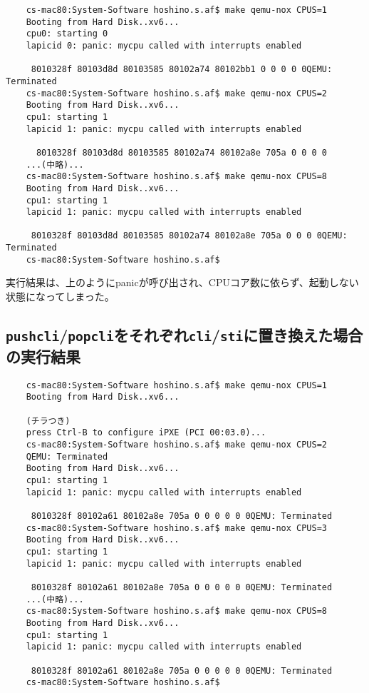 \documentclass[10pt,a4j]{jarticle}
\begin{document}
\begin{screen}
  \begin{verbatim}
    cs-mac80:System-Software hoshino.s.af$ make qemu-nox CPUS=1
    Booting from Hard Disk..xv6...
    cpu0: starting 0
    lapicid 0: panic: mycpu called with interrupts enabled

     8010328f 80103d8d 80103585 80102a74 80102bb1 0 0 0 0 0QEMU: Terminated
    cs-mac80:System-Software hoshino.s.af$ make qemu-nox CPUS=2
    Booting from Hard Disk..xv6...
    cpu1: starting 1
    lapicid 1: panic: mycpu called with interrupts enabled

      8010328f 80103d8d 80103585 80102a74 80102a8e 705a 0 0 0 0
    ...(中略)...
    cs-mac80:System-Software hoshino.s.af$ make qemu-nox CPUS=8
    Booting from Hard Disk..xv6...
    cpu1: starting 1
    lapicid 1: panic: mycpu called with interrupts enabled

     8010328f 80103d8d 80103585 80102a74 80102a8e 705a 0 0 0 0QEMU: Terminated
    cs-mac80:System-Software hoshino.s.af$
  \end{verbatim}
\end{screen}

実行結果は、上のようにpanicが呼び出され、CPUコア数に依らず、起動しない状態になってしまった。

\subsection{\texttt{pushcli}/\texttt{popcli}をそれぞれ\texttt{cli}/\texttt{sti}に置き換えた場合の実行結果}


\begin{screen}
  \begin{verbatim}
    cs-mac80:System-Software hoshino.s.af$ make qemu-nox CPUS=1
    Booting from Hard Disk..xv6...

    (チラつき)
    press Ctrl-B to configure iPXE (PCI 00:03.0)...
    cs-mac80:System-Software hoshino.s.af$ make qemu-nox CPUS=2
    QEMU: Terminated
    Booting from Hard Disk..xv6...
    cpu1: starting 1
    lapicid 1: panic: mycpu called with interrupts enabled

     8010328f 80102a61 80102a8e 705a 0 0 0 0 0 0QEMU: Terminated
    cs-mac80:System-Software hoshino.s.af$ make qemu-nox CPUS=3
    Booting from Hard Disk..xv6...
    cpu1: starting 1
    lapicid 1: panic: mycpu called with interrupts enabled

     8010328f 80102a61 80102a8e 705a 0 0 0 0 0 0QEMU: Terminated
    ...(中略)...
    cs-mac80:System-Software hoshino.s.af$ make qemu-nox CPUS=8
    Booting from Hard Disk..xv6...
    cpu1: starting 1
    lapicid 1: panic: mycpu called with interrupts enabled

     8010328f 80102a61 80102a8e 705a 0 0 0 0 0 0QEMU: Terminated
    cs-mac80:System-Software hoshino.s.af$
  \end{verbatim}
\end{screen}
\end{document}

